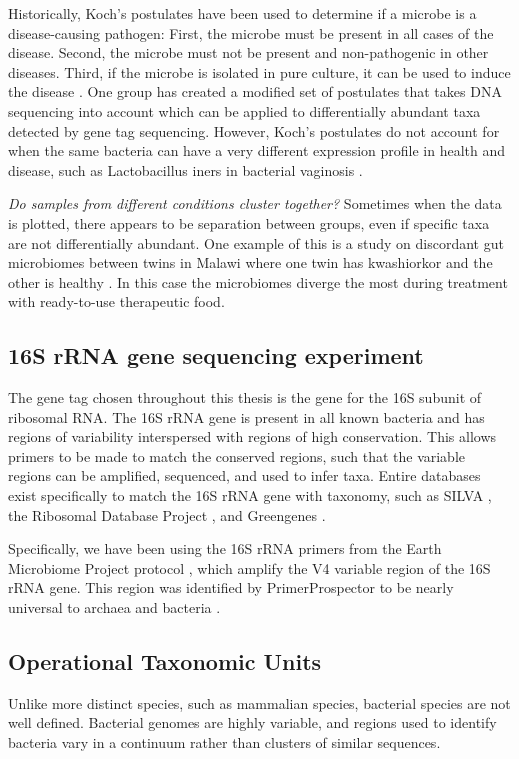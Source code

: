 Historically, Koch’s postulates have been used to determine if a microbe is a disease-causing pathogen: First, the microbe must be present in all cases of the disease. Second, the microbe must not be present and non-pathogenic in other diseases. Third, if the microbe is isolated in pure culture, it can be used to induce the disease \cite{koch1891uber}. One group has created a modified set of postulates that takes DNA sequencing into account \cite{fredericks1996sequence} which can be applied to differentially abundant taxa detected by gene tag sequencing. However, Koch’s postulates do not account for when the same bacteria can have a very different expression profile in health and disease, such as Lactobacillus iners in bacterial vaginosis \cite{macklaim2013comparative}.

\textit{Do samples from different conditions cluster together?}
Sometimes when the data is plotted, there appears to be separation between groups, even if specific taxa are not differentially abundant. One example of this is a study on discordant gut microbiomes between twins in Malawi where one twin has kwashiorkor and the other is healthy \cite{smith2013gut}. In this case the microbiomes diverge the most during treatment with ready-to-use therapeutic food.

\subsection{16S rRNA gene sequencing experiment}
The gene tag chosen throughout this thesis is the gene for the 16S subunit of ribosomal RNA. The 16S rRNA gene is present in all known bacteria and has regions of variability interspersed with regions of high conservation. This allows primers to be made to match the conserved regions, such that the variable regions can be amplified, sequenced, and used to infer taxa. Entire databases exist specifically to match the 16S rRNA gene with taxonomy, such as SILVA \cite{quast2013silva}, the Ribosomal Database Project \cite{cole2009ribosomal}, and Greengenes \cite{desantis2006greengenes}.

Specifically, we have been using the 16S rRNA primers from the Earth Microbiome Project protocol \cite{gilbert2014earth}, which amplify the V4 variable region of the 16S rRNA gene. This region was identified by PrimerProspector to be nearly universal to archaea and bacteria \cite{walters2011primerprospector}.

\subsection{Operational Taxonomic Units}
Unlike more distinct species, such as mammalian species, bacterial species are not well defined. Bacterial genomes are highly variable, and regions used to identify bacteria vary in a continuum rather than clusters of similar sequences.

